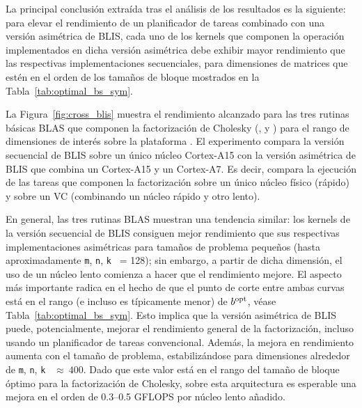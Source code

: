 La principal conclusión extraída tras el análisis de los resultados es la siguiente: para elevar el rendimiento de un planificador
de tareas combinado con una versión asimétrica de BLIS, cada uno de los kernels que componen la operación implementados en dicha
versión asimétrica debe exhibir mayor rendimiento que las respectivas implementaciones secuenciales, para dimensiones de matrices 
que estén en el orden de los tamaños de bloque mostrados en la Tabla~\ref{tab:optimal_bs_sym}.  

La Figura~\ref{fig:cross_blis} muestra el rendimiento alcanzado para las tres rutinas básicas BLAS que componen la factorización
de Cholesky (\gemm, \syrk y \trsm) para el rango de dimensiones de interés sobre la plataforma \odroid.  
El experimento compara la versión secuencial de BLIS sobre un único núcleo Cortex-A15 con la versión asimétrica de BLIS
que combina un Cortex-A15 y un Cortex-A7. Es decir, compara la ejecución de las tareas que componen la factorización sobre un
único núcleo físico (rápido) y sobre un VC (combinando un núcleo rápido y otro lento).

En general, las tres rutinas BLAS muestran una tendencia similar: los kernels de la versión secuencial de BLIS
consiguen mejor rendimiento que sus respectivas implementaciones asimétricas para tamaños de problema pequeños (hasta
aproximadamente {\tt m}, {\tt n}, {\tt k } = 128); sin embargo, 
a partir de dicha dimensión, el uso de un núcleo lento comienza a hacer que el rendimiento mejore. 
El aspecto más importante radica en el hecho de que el punto de corte entre ambas curvas está en el rango (e incluso 
es típicamente menor) de $b^{\mbox{\rm \scriptsize opt}}$, véase Tabla~\ref{tab:optimal_bs_sym}. 
Esto implica que la versión asimétrica de BLIS puede, potencialmente, mejorar el rendimiento general de la factorización, 
incluso usando un planificador de tareas convencional.
Además, la mejora en rendimiento aumenta con el tamaño de problema, estabilizándose para dimensiones alrededor de 
{\tt m}, {\tt n}, {\tt k } $\approx~400$. Dado que este valor está en el rango del tamaño de bloque óptimo para
la factorización de Cholesky, sobre esta arquitectura es esperable una mejora en el orden de 0.3--0.5 GFLOPS por núcleo lento
añadido.

